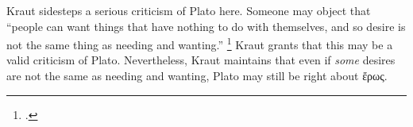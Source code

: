 \documentclass[12pt,letterpaper]{article}
\begin{document}
Kraut sidesteps a serious criticism of Plato here.
Someone may object that ``people can want things that have nothing to do with themselves, and so desire is not the same thing as needing and wanting.''%
\footcite[554]{kraut-plato-on-love-2019}
Kraut grants that this may be a valid criticism of Plato.
Nevertheless, Kraut maintains that even if \textit{some} desires are not the same as needing and wanting, Plato may still be right about \textgreek{ἔρως}.

\newpage
\pagestyle{references}
\printbibliography[filter=sources,title={Ancient Sources: Editions, Translations, Commentaries}]
\printbibliography[filter=secondary,title=Secondary Literature]
\end{document}
